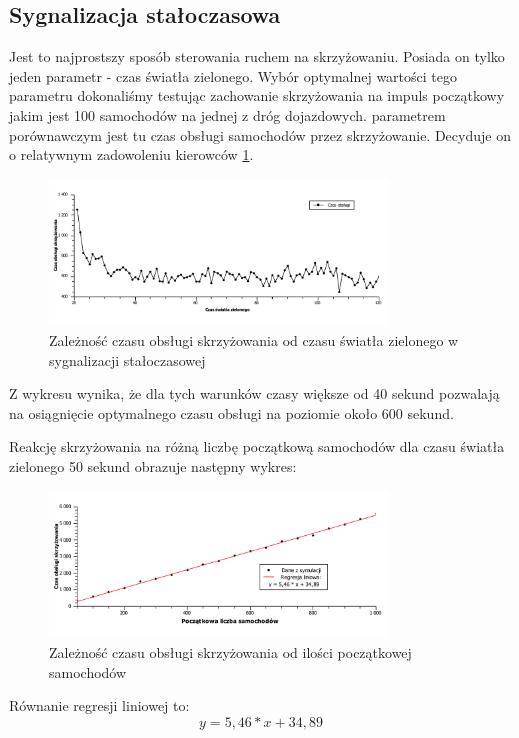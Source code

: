 \documentclass[11pt]{aghdpl}
\begin{document}
\subsection{Sygnalizacja stałoczasowa}
Jest to najprostszy sposób sterowania ruchem na skrzyżowaniu. Posiada on tylko jeden parametr - czas światła zielonego. 
Wybór optymalnej wartości tego parametru dokonaliśmy testując zachowanie skrzyżowania na impuls początkowy jakim jest 100 samochodów na jednej z dróg dojazdowych. parametrem porównawczym jest tu czas obsługi samochodów przez skrzyżowanie. Decyduje on o relatywnym zadowoleniu kierowców \ref{czasobs(time)}.
\begin{figure}[h!]
	\centering
	\includegraphics[width=0.80\textwidth]{czasobs(time).pdf}
	\caption{Zależność czasu obsługi skrzyżowania od czasu światła zielonego w sygnalizacji stałoczasowej}	
	\label{czasobs(time)}
\end{figure}

Z wykresu wynika, że dla tych warunków czasy większe od 40 sekund pozwalają na osiągnięcie optymalnego czasu obsługi na poziomie około 600 sekund.\label{600}

Reakcję skrzyżowania na różną liczbę początkową samochodów dla czasu światła zielonego 50 sekund obrazuje następny wykres:

\begin{figure}[h!]
	\centering
	\includegraphics[width=0.80\textwidth]{czasobs(ilosc).pdf}
	\caption{Zależność czasu obsługi skrzyżowania od ilości początkowej samochodów}	
	\label{czasobs(ilosc)}
\end{figure} 
Równanie regresji liniowej to:
\begin{equation}
	 y = 5,46 * x + 34,89
\end{equation}
\end{document}
